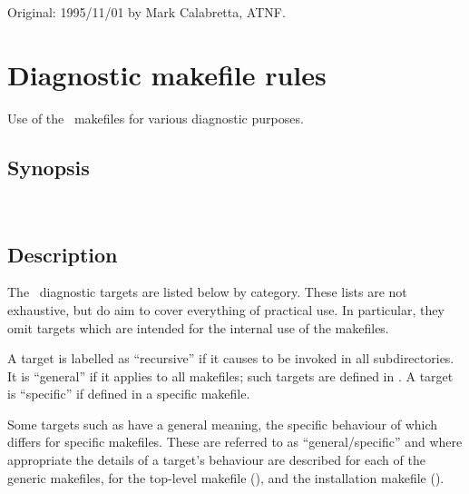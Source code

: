 Original: 1995/11/01 by Mark Calabretta, ATNF.


\newpage
\section{Diagnostic makefile rules}
\label{Diagnostic makefile rules}

Use of the \aipspp\ makefiles for various diagnostic purposes.

\subsection*{Synopsis}

\begin{synopsis}
   \\
\end{synopsis}

\subsection*{Description}

The \aipspp\ diagnostic targets are listed below by category.  These lists
are not exhaustive, but do aim to cover everything of practical use.  In
particular, they omit targets which are intended for the internal use of the
makefiles.

A target is labelled as ``recursive'' if it causes  to be
invoked in all subdirectories.  It is ``general'' if it applies to all
makefiles; such targets are defined in .  A target is
``specific'' if defined in a specific makefile.

Some targets such as  have a general meaning, the specific
behaviour of which differs for specific makefiles.  These are referred to as
``general/specific'' and where appropriate the details of a target's behaviour
are described for each of the generic makefiles, for the top-level makefile
(), and the installation makefile ().

